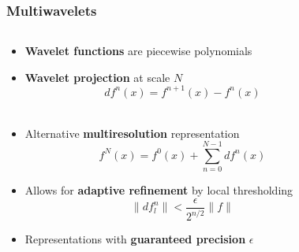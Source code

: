 \begin{frame}
    \frametitle{Multiwavelets}
    \begin{columns}
    \begin{column}[b]{0.55\linewidth}
	\begin{itemize}
	    \item   \textbf{Wavelet functions} are piecewise polynomials
	    \item   \textbf{Wavelet projection} at scale $N$
		    \begin{equation}
			\nonumber
			df^n(x) = f^{n+1}(x) - f^{n}(x)
		    \end{equation}
		    \ \\
	    \item   Alternative \textbf{multiresolution} representation
		    \begin{equation}
			\nonumber
			f^N(x) = f^{0}(x) + \sum_{n=0}^{N-1} df^{n}(x)
		    \end{equation}
	    \item   Allows for \textbf{adaptive refinement} by local thresholding
		    \begin{equation}
			\nonumber
			\|df_l^n\| < \frac{\epsilon}{2^{n/2}}\|f\|
		    \end{equation}
	    \item   Representations with \textbf{guaranteed precision} $\epsilon$
	\end{itemize}
	\ \\
	\ \\
    \end{column}
    \begin{column}[b]{0.45\linewidth}
	\centering

\end{column}
\end{columns}
\end{frame}
